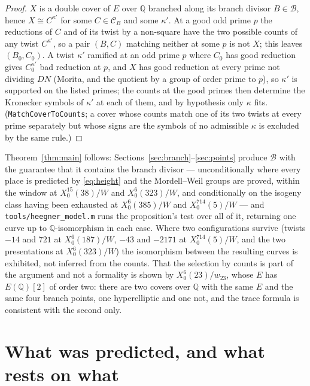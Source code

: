 \documentclass[11pt,reqno]{amsart}
\theoremstyle{plain}
\theoremstyle{definition}
\newcommand{\Q}{\mathbb{Q}}
\begin{document}
\begin{proof}
$X$ is a double cover of $E$ over $\Q$ branched along its branch divisor $B\in\mathcal B$, hence
$X\cong C^{\kappa'}$ for some $C\in\mathcal C_B$ and some $\kappa'$. At a good odd prime $p$ the
reductions of $C$ and of its twist by a non-square have the two possible counts of any twist
$C^{\kappa'}$, so a pair $(B,C)$ matching neither at some $p$ is not $X$; this leaves $(B_0,C_0)$.
A twist $\kappa'$ ramified at an odd prime $p$ where $C_0$ has good reduction gives $C_0^{\kappa'}$
bad reduction at $p$, and $X$ has good reduction at every prime not dividing $DN$ (Morita, and the
quotient by a group of order prime to $p$), so $\kappa'$ is supported on the listed primes; the
counts at the good primes then determine the Kronecker symbols of $\kappa'$ at each of them, and by
hypothesis only $\kappa$ fits. (\texttt{MatchCoverToCounts}; a cover whose counts match one of its
two twists at every prime separately but whose signs are the symbols of no admissible $\kappa$ is
excluded by the same rule.)
\end{proof}

Theorem~\ref{thm:main} follows: Sections~\ref{sec:branch}--\ref{sec:points} produce $\mathcal B$ with
the guarantee that it contains the branch divisor --- unconditionally where every place is
predicted by \eqref{eq:height} and the Mordell--Weil groups are proved, within the window at
$X_0^{15}(38)/W$ and $X_0^6(323)/W$, and conditionally on the isogeny class having been exhausted at
$X_0^6(385)/W$ and $X_0^{714}(5)/W$ --- and \texttt{tools/heegner\_model.m} runs the proposition's
test over all of it, returning one curve up to $\Q$-isomorphism in each case. Where two
configurations survive (twists $-14$ and $721$ at $X_0^6(187)/W$, $-43$ and $-2171$ at
$X_0^{714}(5)/W$, and the two presentations at $X_0^6(323)/W$) the isomorphism between the resulting
curves is exhibited, not inferred from the counts. That the selection by counts is part of the
argument and not a formality is shown by $X_0^6(23)/w_{23}$, whose $E$ has $E(\Q)[2]$ of order two:
there are two covers over $\Q$ with the same $E$ and the same four branch points, one hyperelliptic
and one not, and the trace formula is consistent with the second only.

\section{What was predicted, and what rests on what}\label{sec:checks}
\end{document}
